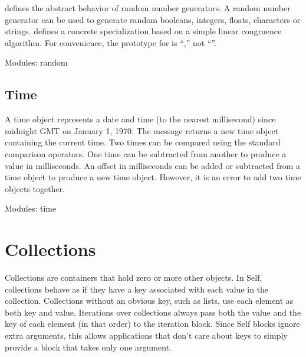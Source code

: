 \documentclass[letterpaper,10pt,english]{sphinxmanual}
\begin{document}
 defines the abstract behavior of random number generators. A random number
generator can be used to generate random booleans, integers, floats, characters or strings.  defines a concrete specialization based on a simple linear congruence algorithm. For
convenience, the prototype for  is “,” not “”.

Modules: random


\subsection{Time}
\label{\detokenize{numbers:time}}
\begin{sphinxVerbatim}[commandchars=\\\{\}]
\end{sphinxVerbatim}

A time object represents a date and time (to the nearest millisecond) since midnight GMT on January
1, 1970. The message  returns a new time object containing the current time. Two
times can be compared using the standard comparison operators. One time can be subtracted from
another to produce a value in milliseconds. An offset in milliseconds can be added or subtracted
from a time object to produce a new time object. However, it is an error to add two time objects
together.

Modules: time


\section{Collections}
\label{\detokenize{collections:collections}}\label{\detokenize{collections::doc}}
\begin{sphinxVerbatim}[commandchars=\\\{\}]
           
\end{sphinxVerbatim}

Collections are containers that hold zero or more other objects. In Self, collections behave as if
they have a key associated with each value in the collection. Collections without an obvious key,
such as lists, use each element as both key and value. Iterations over collections always pass both
the value and the key of each element (in that order) to the iteration block. Since Self blocks ignore
extra arguments, this allows applications that don’t care about keys to simply provide a block
that takes only one argument.
\end{document}
